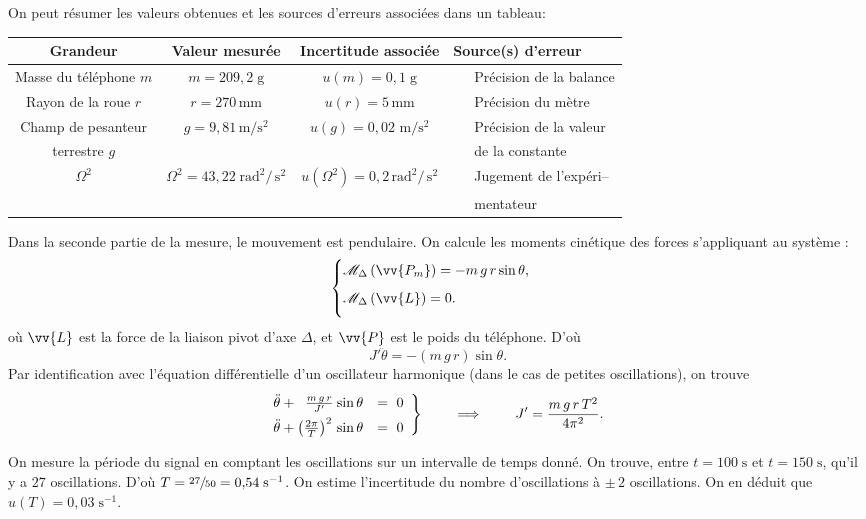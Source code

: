 \documentclass[a4paper]{report}
\newcommand{\tabitem}{~\llap{--}~~}
\newcommand{\tabnoitem}{~~~}
\let\vec\vv
\begin{document}
	On peut résumer les valeurs obtenues et les sources d'erreurs associées dans un tableau:

	\begin{adjustbox}{center}
		\begin{tabular}{|c|c|c|l|}\hline
			\sc Grandeur&\sc Valeur mesurée&\sc Incertitude associée&\sc Source(s) d'erreur\\ \hline
			Masse du téléphone $m$&$m = 209,\!2\;\text{g}$&$u(m)= 0,\!1\;\text{g}$&\tabitem Précision de la balance\\ \hline
			Rayon de la roue $r$&$r = 270\,\text{mm}$&$u(r)= 5\,\text{mm}$&\tabitem Précision du mètre\\ \hline
			Champ de pesanteur&$g = 9,\!81\,\text{m}/\text{s}^2$&$u(g)= 0,\!02\,\,\text{m}/\text{s}^2$&\tabitem Précision de la valeur\\[-2mm]
			terrestre $g$&&&\tabnoitem de la constante\\ \hline
			$\Omega^2$&$\Omega^2 = 43,\!22\; \text{rad}^2/\,\text{s}^2$&$u(\Omega^2)= 0,\!2\,\text{rad}^2/\,\text{s}^2$&\tabitem Jugement de l'expéri--\\[-2mm]
			&&&\tabnoitem mentateur\\\hline
		\end{tabular}
	\end{adjustbox}

	Dans la seconde partie de la mesure, le mouvement est pendulaire. On calcule les moments cinétique des forces s'appliquant au système : \[
		\begin{cases}
			\mathcal{M}_\Delta\left( \vec{P_m} \right) = -m\,g\,r \sin \theta,\\[2mm]
			\mathcal{M}_\Delta\left( \vec{L} \right) = 0.\\[2mm]
		\end{cases}
	\] où $\vec{L}$ est la force de la liaison pivot d'axe $\Delta$, et $\vec{P}$ est le poids du téléphone. D'où \[
		J' \ddot{\theta} = -(m\,g\,r) \sin \theta.
	\] Par identification avec l'équation différentielle d'un oscillateur harmonique (dans le cas de petites oscillations), on trouve
	\[
		\begin{rcases*}
			\ddot{\theta} + \mathrlap{\;\;\frac{m\,g\,r}{J'}}\phantom{\left( \frac{2\pi}{T} \right)^2\,} \sin \theta &=\; 0\\
			\ddot{\theta} + \left( \frac{2\pi}{T} \right)^2\,\sin \theta &=\; 0\,
		\end{rcases*} \qquad
		\implies\qquad
		J' = \frac{m\,g\,r\,T^2}{4\pi^2}.
	\]

	On mesure la période du signal en comptant les oscillations sur un intervalle de temps donné. On trouve, entre $t = 100\;\text{s}$ et $t = 150\;\text{s}$, qu'il y a $27$ oscillations. D'où $T = \sfrac{27}{50} = 0,\!54\;\text{s}^{-1}$. On estime l'incertitude du nombre d'oscillations à $\pm\, 2$ oscillations. On en déduit que $u(T) = 0,\!03\;\text{s}^{-1}$.
\end{document}

